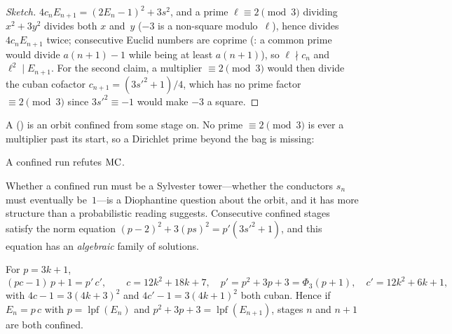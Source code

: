 \begin{proof}[Sketch]
$4c_nE_{n+1} = (2E_n-1)^2 + 3s^2$, and a prime $\ell \equiv 2 \pmod 3$
dividing $x^2 + 3y^2$ divides both $x$ and~$y$ ($-3$ is a non-square
modulo~$\ell$), hence divides $4c_nE_{n+1}$ twice; consecutive Euclid
numbers are coprime
(:
a common prime would divide $a(n{+}1)-1$ while being at least $a(n{+}1)$),
so $\ell \nmid c_n$ and $\ell^2 \mid E_{n+1}$.  For the second claim, a
multiplier $\equiv 2 \pmod 3$ would then divide the cuban cofactor
$c_{n+1} = (3s'^2+1)/4$, which has no prime factor $\equiv 2 \pmod 3$
since $3s'^2 \equiv -1$ would make $-3$ a square.
\end{proof}

A 
() is an orbit confined
from some stage on.  No prime $\equiv 2 \pmod 3$ is ever a multiplier past
its start, so a Dirichlet prime beyond the bag is missing:

\begin{theorem}
\label{thm:confined-run}
A confined run refutes $\mathrm{MC}$.
\end{theorem}

Whether a confined run must be a Sylvester tower---whether the
conductors $s_n$ must eventually be~$1$---is a Diophantine question about
the orbit, and it has more structure than a probabilistic reading
suggests.  Consecutive confined stages satisfy the norm equation
$(p-2)^2 + 3(ps)^2 = p'(3s'^2+1)$, and this equation has an
\emph{algebraic} family of solutions.

\begin{theorem}
\label{thm:shifted-tower}
For $p = 3k+1$,
\[
  (pc - 1)\,p + 1 = p'\,c', \qquad
  c = 12k^2+18k+7,\quad p' = p^2+3p+3 = \Phi_3(p{+}1),\quad c' = 12k^2+6k+1,
\]
with $4c-1 = 3(4k{+}3)^2$ and $4c'-1 = 3(4k{+}1)^2$ both cuban.  Hence if
$E_n = p\,c$ with $p = \operatorname{lpf}(E_n)$ and $p^2+3p+3 =
\operatorname{lpf}(E_{n+1})$, stages $n$ and $n{+}1$ are both confined.
\end{theorem}

